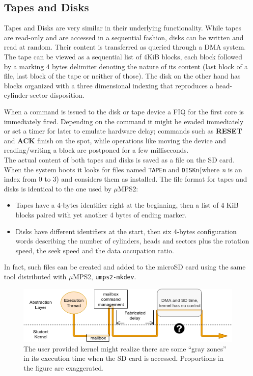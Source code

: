 \documentclass[12pt,a4paper,openright,twoside]{report}
\begin{document}
\subsection{Tapes and Disks}
Tapes and Disks are very similar in their underlying functionality. While tapes 
are read-only and are accessed in a sequential fashion, disks can be written and
read at random. Their content is transferred as queried through a DMA system.\\
The tape can be viewed as a sequential list of 4KiB blocks, each block followed
by a marking 4 bytes delimiter denoting the nature of its content (last block of 
a file, last block of the tape or neither of those).
The disk on the other hand has blocks organized with a three dimensional indexing
that reproduces a head-cylinder-sector disposition.

When a command is issued to the disk or tape device a FIQ for the first core is immediately
fired. Depending on the command it might be evaded immediately or set a timer for
later to emulate hardware delay; commands such as \textbf{RESET} and \textbf{ACK}
finish on the spot, while operations like moving the device and reading/writing
 a block are postponed for a few milliseconds.\\

The actual content of both tapes and disks is saved as a file on the SD card. When the system 
boots it looks for files named {\tt TAPEn} and {\tt DISKn}(where \textit{n}
 is an index from 0 to 3) and considers them as installed. 
The file format for tapes and disks is identical to the one used by $\mu$MPS2: 
\begin{itemize}
    \item Tapes have a 4-bytes identifier right at the beginning, then 
        a list of 4 KiB blocks paired with yet another 4 bytes of ending marker.
    \item Disks have different identifiers at the start, then six 4-bytes configuration
        words describing the number of cylinders, heads and sectors plus the rotation
        speed, the seek speed and the data occupation ratio.
\end{itemize}
In fact, such files can be created and added to the microSD card using the same tool
distributed with $\mu$MPS2, {\tt umps2-mkdev}.

 \begin{figure}[t]
    \begin{center}
 \includegraphics[scale=0.65]{images/tesi13.png}
 \caption[HAL Execution Thread]{The user provided kernel might realize there are some
 ``gray zones'' in its execution time when the SD card is accessed. Proportions
 in the figure are exaggerated.}
 \label{fig:executionthread}
    \end{center}
 \end{figure}
\end{document}
